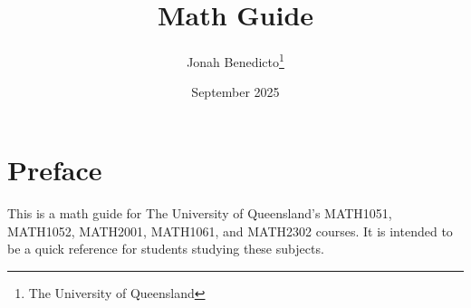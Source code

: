 \documentclass[12pt, letterpaper]{book}
\title{Math Guide}
\author{Jonah Benedicto\thanks{The University of Queensland}}
\date{September 2025}
\begin{document}
\maketitle

\newpage

\section*{Preface}
This is a math guide for The University of Queensland's MATH1051, MATH1052, MATH2001, MATH1061, and MATH2302 courses. It is intended to be a quick reference for students studying these subjects.

\tableofcontents
















\end{document}
